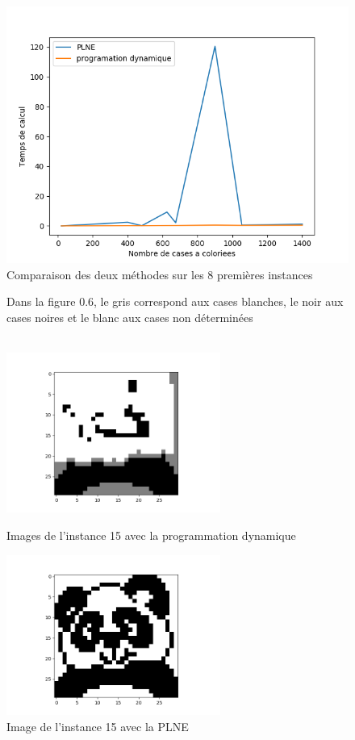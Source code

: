 \documentclass[a4paper]{memoir}
\begin{document}
\begin{figure}[h]
  \centering
  \includegraphics[width=0.75\linewidth]{../images/comparaison.png}
  \caption{Comparaison des deux méthodes sur les 8 premières instances}
  \label{fig:graphes-comparaison}
\end{figure}

\begin{figure}[h]
 Dans la figure 0.6, le gris correspond aux cases blanches, le noir aux cases noires et le blanc aux cases non déterminées\\\\
\begin{minipage}[c]{.45\linewidth}
  \centering
    \includegraphics[width = 7cm]{../images/dynamique_instance15.png}
    \caption{Images de l'instance 15 avec la programmation dynamique}
    \label{fig:dynamique15}
\end{minipage}\hfill
\begin{minipage}[c]{.45\linewidth}
    \includegraphics[width = 7cm]{../images/plne_instance15.png}
    \caption{Image de l'instance 15 avec la PLNE}
    \label{fig:plne15}
\end{minipage}
\end{figure}
\end{document}
